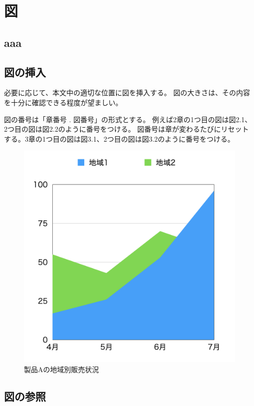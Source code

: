 \chapter{図}

\section{aaa}
\section{図の挿入}

必要に応じて、本文中の適切な位置に図を挿入する。
図の大きさは、その内容を十分に確認できる程度が望ましい。

図の番号は「章番号 . 図番号」の形式とする。
例えば2章の1つ目の図は図2.1、2つ目の図は図2.2のように番号をつける。
図番号は章が変わるたびにリセットする。3章の1つ目の図は図3.1、2つ目の図は図3.2のように番号をつける。

\begin{figure}[htbp]
  \centering
  \includegraphics[width=0.5\linewidth]{fig/chart1.png}
  \caption{製品Aの地域別販売状況}
  \label{fig:chart1}
\end{figure}

\section{図の参照}

